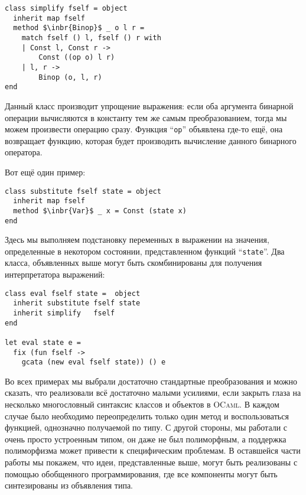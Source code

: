 
\begin{lstlisting}
class simplify fself = object 
  inherit map fself
  method $\inbr{Binop}$ _ o l r =
    match fself () l, fself () r with
    | Const l, Const r -> 
        Const ((op o) l r)
    | l, r -> 
        Binop (o, l, r)
end
\end{lstlisting}

\noindent Данный класс производит упрощение выражения: если оба аргумента бинарной операции вычисляются в константу тем же самым преобразованием, тогда 
мы можем произвести операцию сразу. Функция ``\lstinline{op}'' объявлена где-то ещё, она возвращает функцию, которая будет производить вычисление данного бинарного оператора.

Вот ещё один пример:

\begin{lstlisting}
class substitute fself state = object 
  inherit map fself
  method $\inbr{Var}$ _ x = Const (state x)  
end
\end{lstlisting}

\noindent Здесь мы выполняем подстановку переменных в выражении на значения, определенные в некотором состоянии, представленном функций ``\lstinline{state}''. Два класса, объявленных выше могут быть скомбинированы для получения интерпретатора выражений:

\begin{lstlisting}
class eval fself state =  object
  inherit substitute fself state
  inherit simplify   fself
end

let eval state e =
  fix (fun fself ->
    gcata (new eval fself state)) () e  
\end{lstlisting}

Во всех примерах мы выбрали достаточно стандартные преобразования и можно сказать, что реализовали всё достаточно малыми усилиями,
если закрыть глаза на несколько многословный синтаксис классов и объектов в  \textsc{OCaml}. В каждом случае было необходимо переопределить
только один метод и воспользоваться функцией, однозначно получаемой по типу. 
С другой стороны, мы работали с очень просто устроенным типом, он даже не был полиморфным, а поддержка полиморфизма может привести к 
специфическим проблемам. В оставшейся части работы мы покажем, что идеи, представленные выше, могут быть реализованы с помощью обобщенного программирования, где все компоненты могут быть синтезированы из объявления типа. 


